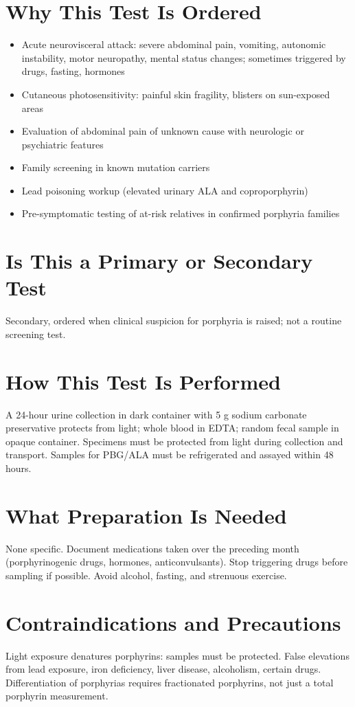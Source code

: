 \section*{Why This Test Is Ordered}
\begin{itemize}
  \item Acute neurovisceral attack: severe abdominal pain, vomiting, autonomic instability, motor neuropathy, mental status changes; sometimes triggered by drugs, fasting, hormones
  \item Cutaneous photosensitivity: painful skin fragility, blisters on sun-exposed areas
  \item Evaluation of abdominal pain of unknown cause with neurologic or psychiatric features
  \item Family screening in known mutation carriers
  \item Lead poisoning workup (elevated urinary ALA and coproporphyrin)
  \item Pre-symptomatic testing of at-risk relatives in confirmed porphyria families
\end{itemize}

\section*{Is This a Primary or Secondary Test}
Secondary, ordered when clinical suspicion for porphyria is raised; not a routine screening test.

\section*{How This Test Is Performed}
A 24-hour urine collection in dark container with 5 g sodium carbonate preservative protects from light; whole blood in EDTA; random fecal sample in opaque container. Specimens must be protected from light during collection and transport. Samples for PBG/ALA must be refrigerated and assayed within 48 hours.

\section*{What Preparation Is Needed}
None specific. Document medications taken over the preceding month (porphyrinogenic drugs, hormones, anticonvulsants). Stop triggering drugs before sampling if possible. Avoid alcohol, fasting, and strenuous exercise.

\section*{Contraindications and Precautions}
Light exposure denatures porphyrins: samples must be protected. False elevations from lead exposure, iron deficiency, liver disease, alcoholism, certain drugs. Differentiation of porphyrias requires fractionated porphyrins, not just a total porphyrin measurement.

